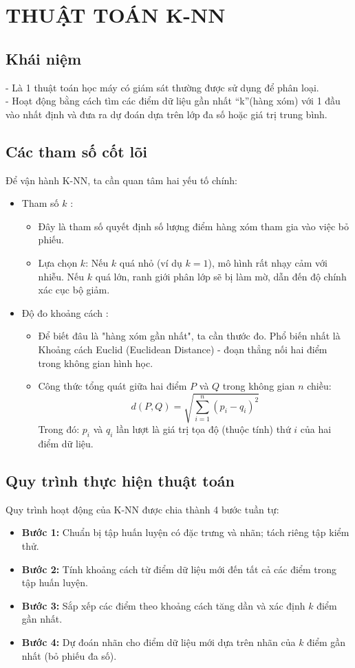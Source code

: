 \section{THUẬT TOÁN K-NN}

\subsection{Khái niệm}
- Là 1 thuật toán học máy có giám sát thường được sử dụng để phân loại.\\
- Hoạt động bằng cách tìm các điểm dữ liệu gần nhất “k”(hàng xóm) với 1 đầu vào nhất định và đưa ra dự đoán dựa trên lớp đa số hoặc giá trị trung bình.

\subsection{Các tham số cốt lõi}
Để vận hành K-NN, ta cần quan tâm hai yếu tố chính:
\begin{itemize}
    \item Tham số $k$ :
    \begin{itemize}
        \item Đây là tham số quyết định số lượng điểm hàng xóm tham gia vào việc bỏ phiếu.
        \item Lựa chọn $k$: Nếu $k$ quá nhỏ (ví dụ $k=1$), mô hình rất nhạy cảm với nhiễu. Nếu $k$ quá lớn, ranh giới phân lớp sẽ bị làm mờ, dẫn đến độ chính xác cục bộ giảm.
    \end{itemize}
    \item Độ đo khoảng cách :
    \begin{itemize}
        \item Để biết đâu là "hàng xóm gần nhất", ta cần thước đo. Phổ biến nhất là Khoảng cách Euclid (Euclidean Distance) - đoạn thẳng nối hai điểm trong không gian hình học.
        \item Công thức tổng quát giữa hai điểm $P$ và $Q$ trong không gian $n$ chiều:
        $$d(P,Q) = \sqrt{\sum_{i=1}^{n}(p_i - q_i)^2}$$
        Trong đó: $p_i$ và $q_i$ lần lượt là giá trị tọa độ (thuộc tính) thứ $i$ của hai điểm dữ liệu.
    \end{itemize}
\end{itemize}

\subsection{Quy trình thực hiện thuật toán}
Quy trình hoạt động của K-NN được chia thành 4 bước tuần tự:
\begin{itemize}
    \item \textbf{Bước 1:} Chuẩn bị tập huấn luyện có đặc trưng và nhãn; tách riêng tập kiểm thử.
    \item \textbf{Bước 2:} Tính khoảng cách từ điểm dữ liệu mới đến tất cả các điểm trong tập huấn luyện.
    \item \textbf{Bước 3:} Sắp xếp các điểm theo khoảng cách tăng dần và xác định $k$ điểm gần nhất.
    \item \textbf{Bước 4:} Dự đoán nhãn cho điểm dữ liệu mới dựa trên nhãn của $k$ điểm gần nhất (bỏ phiếu đa số).
\end{itemize}

